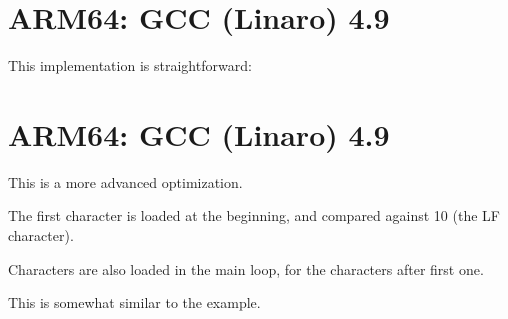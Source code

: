 ﻿\section{ARM64: \NonOptimizing GCC (Linaro) 4.9}

This implementation is straightforward:



\section{ARM64: \Optimizing GCC (Linaro) 4.9}

This is a more advanced optimization.

The first character is loaded at the beginning, and compared against 10 (the \ac{LF} character).

Characters are also loaded in the main loop, for the characters after first one.

This is somewhat similar to the  example.



